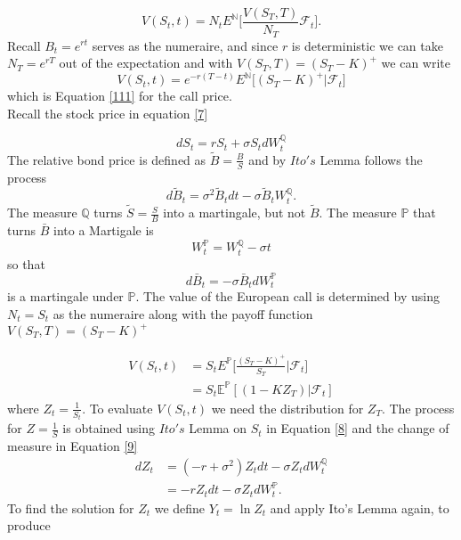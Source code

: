 \documentclass[a4 paper, 12pt]{report}
\theoremstyle{plain}
\begin{document}
\begin{equation}\label{8}
V(S_t,t) = N_tE^{\mathbb{N}}\bigg[\frac{V(S_T,T)}{N_T}\mathcal{F}_t\bigg].
\end{equation}
Recall $B_t = e^{rt}$ serves as the numeraire, and since $r$ is deterministic we can take $N_T = e^{rT}$ out of the expectation and with $V(S_T,T) = (S_T - K)^+$ we can write
$$
V(S_t,t) = e^{-r(T-t)}E^{\mathbb{N}}\bigg[(S_T - K)^+\bigg|\mathcal{F}_t\bigg]
$$
which is Equation \eqref{111} for the call price.\\
Recall the stock price in equation \eqref{7}

$$
dS_t = rS_t+\sigma S_tdW_t^{\mathbb{Q}}
$$
The relative bond price is defined as $\tilde{B} = \frac{B}{S}$ and by $Ito's$ Lemma follows the process
$$
d\tilde{B}_t = \sigma^2\tilde{B}_tdt  - \sigma \tilde{B}_tW_t^{\mathbb{Q}}.
$$
The measure $\mathbb{Q}$ turns $\tilde{S} = \frac{S}{B}$ into a martingale, but not  $\tilde{B}$. The measure $\mathbb{P}$ that turns $\bar{B}$ into a Martigale is 
\begin{equation}\label{9}
W_t^{\mathbb{P}} = W_t^{\mathbb{Q}} - \sigma t
\end{equation}
so that
$$
d\bar{B}_t = -\sigma \bar{B}_tdW_t^{\mathbb{P}}
$$
is a martingale under $\mathbb{P}$. The value of the European call is determined by using $N_t = S_t$ as the numeraire along with the payoff function $V(S_T, T) = (S_T - K)^+$

\begin{equation}\label{100}
\begin{split}
V(S_t,t)& = S_t E^{\mathbb{P}}\bigg[\frac{(S_T - K)^+}{S_T}\bigg|\mathcal{F}_t\bigg]\\
& = S_t\mathbb{E}^{\mathbb{P}}[(1-KZ_T)|\mathcal{F}_t]
\end{split}
\end{equation}
where $Z_t = \frac{1}{S_t}$. To evaluate $V(S_t,t)$ we need the distribution for $Z_T$. The process for $Z = \frac{1}{S}$ is obtained using $Ito's$ Lemma on $S_t$ in Equation \eqref{8} and the change of measure in Equation \eqref{9}
\begin{align*}
dZ_t& = (-r+\sigma^2)Z_tdt - \sigma Z_tdW_t^{\mathbb{Q}}\\
& = -rZ_tdt - \sigma Z_tdW_t^{\mathbb{P}}.
\end{align*}
To find the solution for $Z_t$ we define $Y_t = \ln Z_t$ and apply Ito's Lemma again, to produce
\end{document}
